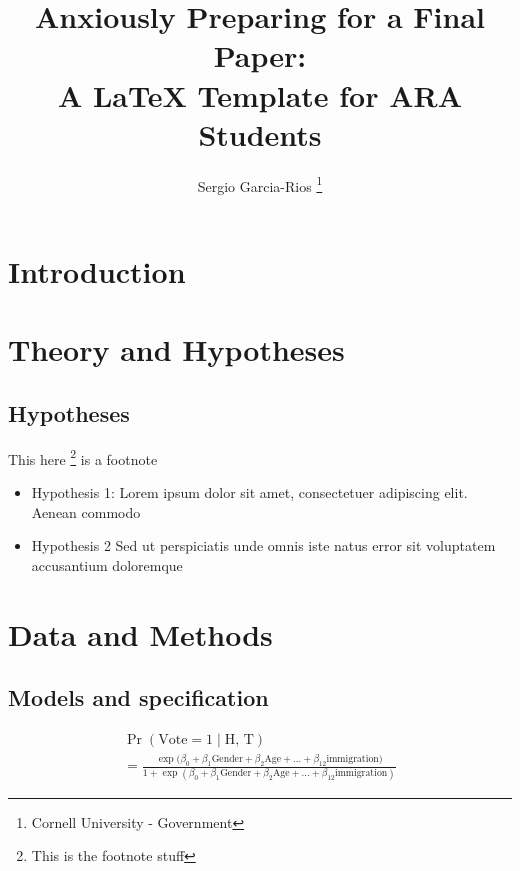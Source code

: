 \documentclass{article}
\author{Sergio Garcia-Rios 
	\thanks{Cornell University - Government}
	}
\title{Anxiously Preparing for a Final Paper: \\ 
A LaTeX Template for ARA Students}
\date{}
\begin{document}
\clearpage

\section{Introduction}
\lipsum[1-3]

\section{Theory and Hypotheses}
\lipsum[2]

\subsection{Hypotheses}
\lipsum[2] This here \footnote{This is the footnote stuff} is a footnote

\begin{itemize}
    \item Hypothesis 1: Lorem ipsum dolor sit amet, consectetuer adipiscing elit. Aenean commodo
    \item Hypothesis 2 Sed ut perspiciatis unde omnis iste natus error sit voluptatem accusantium doloremque
\end{itemize}


\lipsum[1]

\section{Data and Methods}

\lipsum[2]


\lipsum[3]

\subsection{Models and specification}

\lipsum[4]


\begin{multline}
  \operatorname{Pr}(\text{Vote} = 1 \mid \text{H, T})\\
 = \frac{\exp(\beta_{0} + \beta_{1} \text{Gender} + \beta_{2} \text{Age} + \dots +
    \beta_{12} \text{immigration)} }{1 + \exp(\beta_{0} + \beta_{1} \text{Gender} + \beta_{2} \text{Age} +
\dots + \beta_{12 }\text{immigration})} \label{eq:glm1} 
\end{multline}



\lipsum[5]
\end{document}
